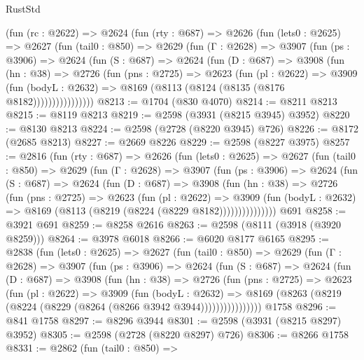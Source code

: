 \begin{lexlean}{RustStd}
\begin{coremodule}
    (fun (rc : @2622) =>
    @2624
      (fun (rty : @687) =>
      @2626
        (fun (lets0 : @2625) =>
        @2627
          (fun (tail0 : @850) =>
          @2629
            (fun (Γ : @2628) =>
            @3907
              (fun (ps : @3906) =>
              @2624
                (fun (S : @687) =>
                @2624
                  (fun (D : @687) =>
                  @3908
                    (fun (hn : @38) =>
                    @2726
                      (fun (pns : @2725) =>
                      @2623
                        (fun (pl : @2622) =>
                        @3909
                          (fun (bodyL : @2632) =>
                          @8169 (@8113 (@8124 (@8135 (@8176 @8182))))))))))))))))
@8213 := @1704 (@830 @4070)
@8214 := @8211 @8213
@8215 := @8119 @8213
@8219 := @2598 (@3931 (@8215 @3945) @3952)
@8220 := @8130 @8213
@8224 := @2598 (@2728 (@8220 @3945) @726)
@8226 := @8172 (@2685 @8213)
@8227 := @2669 @8226
@8229 := @2598 (@8227 @3975)
@8257 := @2816
    (fun (rty : @687) =>
    @2626
      (fun (lets0 : @2625) =>
      @2627
        (fun (tail0 : @850) =>
        @2629
          (fun (Γ : @2628) =>
          @3907
            (fun (ps : @3906) =>
            @2624
              (fun (S : @687) =>
              @2624
                (fun (D : @687) =>
                @3908
                  (fun (hn : @38) =>
                  @2726
                    (fun (pns : @2725) =>
                    @2623
                      (fun (pl : @2622) =>
                      @3909
                        (fun (bodyL : @2632) =>
                        @8169 (@8113 (@8219 (@8224 (@8229 @8182)))))))))))))))
    @691
@8258 := @3921 @691
@8259 := @8258 @2616
@8263 := @2598 (@8111 (@3918 (@3920 @8259)))
@8264 := @3978 @6018
@8266 := @6020 @8177 @6165
@8295 := @2838
    (fun (lets0 : @2625) =>
    @2627
      (fun (tail0 : @850) =>
      @2629
        (fun (Γ : @2628) =>
        @3907
          (fun (ps : @3906) =>
          @2624
            (fun (S : @687) =>
            @2624
              (fun (D : @687) =>
              @3908
                (fun (hn : @38) =>
                @2726
                  (fun (pns : @2725) =>
                  @2623
                    (fun (pl : @2622) =>
                    @3909
                      (fun (bodyL : @2632) =>
                      @8169 (@8263 (@8219 (@8224 (@8229 (@8264 (@8266 @3942 @3944))))))))))))))))
    @1758
@8296 := @841 @1758
@8297 := @8296 @3944
@8301 := @2598 (@3931 (@8215 @8297) @3952)
@8305 := @2598 (@2728 (@8220 @8297) @726)
@8306 := @8266 @1758
@8331 := @2862
    (fun (tail0 : @850) =>

\end{coremodule}
\end{lexlean}
